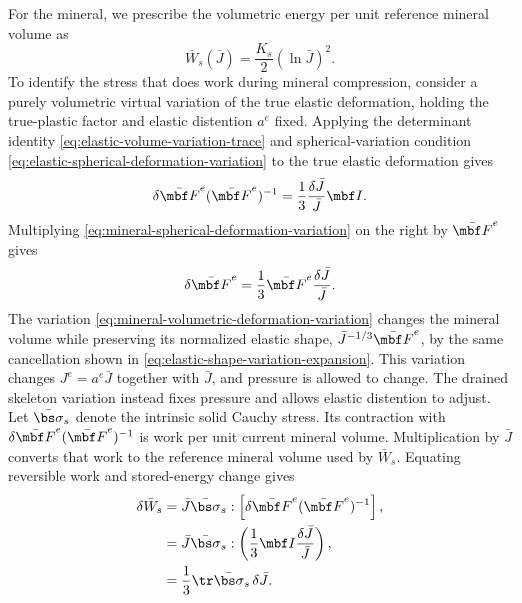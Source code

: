 For the mineral, we prescribe the volumetric energy per unit reference
mineral volume as
\begin{equation}
 \bar W_s(\bar J)=\frac{K_s}{2}(\ln\bar J)^2.
 \label{eq:mineral-volumetric-reference-energy}
\end{equation}
To identify the stress that does work during mineral compression, consider
a purely volumetric virtual variation
of the true elastic deformation, holding the true-plastic factor and
elastic distention \(a^e\) fixed.  Applying the determinant identity
\eqref{eq:elastic-volume-variation-trace} and spherical-variation condition
\eqref{eq:elastic-spherical-deformation-variation} to the true elastic
deformation gives
\begin{equation}
 \delta\bar{\mbf F}^e(\bar{\mbf F}^e)^{-1}
 =\frac13\frac{\delta\bar J}{\bar J}\mbf I.
 \label{eq:mineral-spherical-deformation-variation}
\end{equation}
Multiplying \eqref{eq:mineral-spherical-deformation-variation} on the
right by \(\bar{\mbf F}^e\) gives
\begin{equation}
 \delta\bar{\mbf F}^e
 =\frac13\bar{\mbf F}^e\frac{\delta\bar J}{\bar J}.
 \label{eq:mineral-volumetric-deformation-variation}
\end{equation}
The variation \eqref{eq:mineral-volumetric-deformation-variation} changes
the mineral volume while preserving its normalized elastic shape,
\(\bar J^{-1/3}\bar{\mbf F}^e\), by the same cancellation shown in
\eqref{eq:elastic-shape-variation-expansion}.
This variation changes \(J^e=a^e\bar J\) together with \(\bar J\), and
pressure is allowed to change.  The drained skeleton variation instead
fixes pressure and allows elastic distention to adjust.
Let \(\bar{\bs\sigma}_s\) denote the intrinsic solid Cauchy stress.
Its contraction with
\(\delta\bar{\mbf F}^e(\bar{\mbf F}^e)^{-1}\) is work per unit current
mineral volume.  Multiplication by \(\bar J\) converts that work to the
reference mineral volume used by \(\bar W_s\).
Equating reversible work and stored-energy change gives
\begin{align}
 \delta\bar W_s
 &=\bar J\bar{\bs\sigma}_s:
 \left[\delta\bar{\mbf F}^e(\bar{\mbf F}^e)^{-1}\right],
 \label{eq:mineral-volumetric-stress-work}\\
 &=\bar J\bar{\bs\sigma}_s:
 \left(\frac13\mbf I\frac{\delta\bar J}{\bar J}\right),
 \notag
\\
 &=\frac13\tr\bar{\bs\sigma}_s\,\delta\bar J.
 \label{eq:mineral-volumetric-work-trace}
\end{align}
